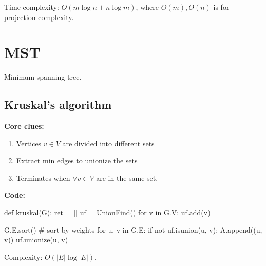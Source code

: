 Time complexity: $O(m\log n + n \log m)$, where $O(m), O(n)$ is for projection complexity.
\section{MST}
Minimum spanning tree.
\subsection{Kruskal's algorithm}
\textbf{Core clues:}
\begin{enumerate}
\item Vertices $v \in V$ are divided into different sets
\item Extract min edges to unionize the sets
\item Terminates when $\forall v\in V$ are in the same set.
\end{enumerate}
\textbf{Code:}
\begin{python}[mathescape]
def kruskal(G):
  ret = []
  uf = UnionFind()
  for v in G.V:
    uf.add(v)

  G.E.sort()  # sort by weights
  for u, v in G.E:
    if not uf.isunion(u, v):
      A.append((u, v))
      uf.unionize(u, v)
\end{python}
Complexity: $O(|E|\log |E|)$.
